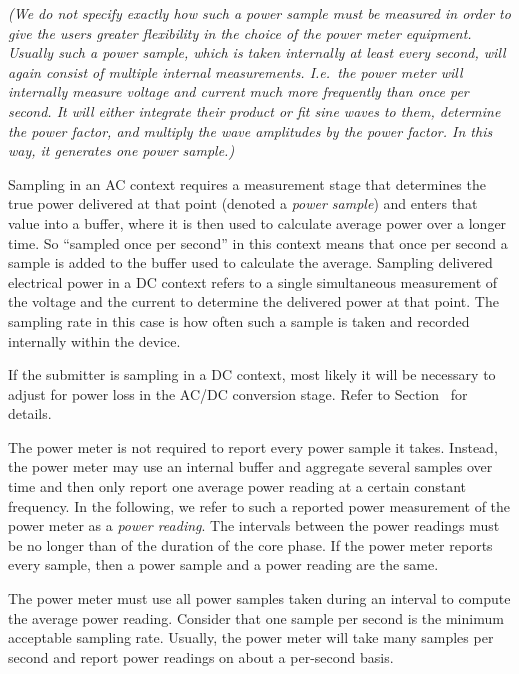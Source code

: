 \noindent
\textit{(We do not specify exactly how such a power sample must be measured in order to give the users greater flexibility in the choice of the power meter equipment.
Usually such a power sample, which is taken internally at least every second, will again consist of multiple internal measurements.
I.e.~the power meter will internally measure voltage and current much more frequently than once per second.
It will either integrate their product or fit sine waves to them, determine the power factor, and multiply the wave amplitudes by the power factor.
In this way, it generates one power sample.)}
\wl

\noindent
Sampling in an AC context requires a measurement stage that determines the true power delivered at that point (denoted a \textit{power sample}) and enters that value into a buffer, where it is then used to calculate average power over a longer time.
So ``sampled once per second'' in this context means that once per second a sample is added to the buffer used to calculate the average.
Sampling delivered electrical power in a DC context refers to a single simultaneous measurement of the voltage and the current to determine the delivered power at that point.
The sampling rate in this case is how often such a sample is taken and recorded internally within the device.
\wl

\noindent
If the submitter is sampling in a DC context, most likely it will be necessary to adjust for power loss in the AC/DC conversion stage.
Refer to Section~ for details.
\wl

\noindent
The power meter is not required to report every power sample it takes.
Instead, the power meter may use an internal buffer and aggregate several samples over time and then only report one average power reading at a certain constant frequency.
In the following, we refer to such a reported power measurement of the power meter as a \textit{power reading}.
The intervals between the power readings must be no longer than \MaxReadingIntervalCorePhaseLTwoThree{} of the duration of the core phase.
If the power meter reports every sample, then a power sample and a power reading are the same.
\wl

\noindent
The power meter must use all power samples taken during an interval to compute the average power reading.
Consider that one sample per second is the minimum acceptable sampling rate.
Usually, the power meter will take many samples per second and report power readings on about a per-second basis.

